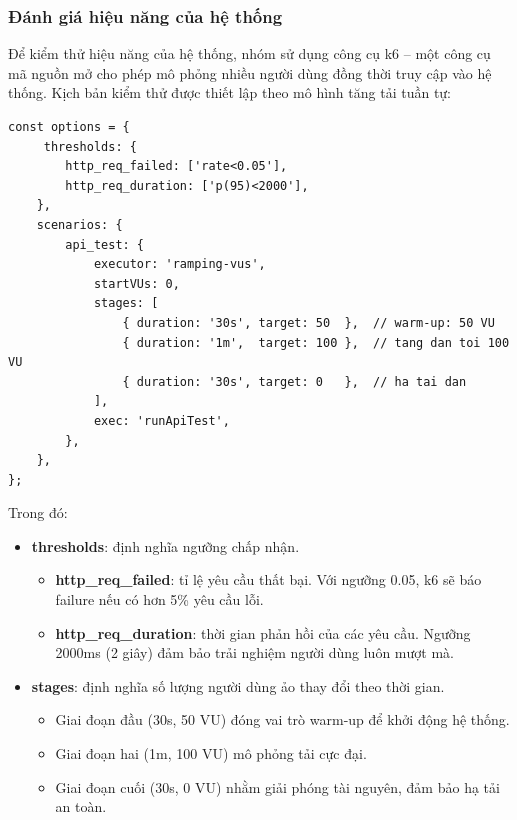 \subsubsection{Đánh giá hiệu năng của hệ thống}
Để kiểm thử hiệu năng của hệ thống, nhóm sử dụng công cụ k6 – một công cụ mã nguồn mở cho phép mô phỏng nhiều người dùng đồng thời truy cập vào hệ thống.
Kịch bản kiểm thử được thiết lập theo mô hình tăng tải tuần tự:

\begin{lstlisting}[frame=single, basicstyle=\small\ttfamily, breaklines=true, commentstyle=\color{gray}\itshape]
const options = {
     thresholds: {
        http_req_failed: ['rate<0.05'],
        http_req_duration: ['p(95)<2000'],  
    },
    scenarios: {
        api_test: {
            executor: 'ramping-vus',
            startVUs: 0,
            stages: [
                { duration: '30s', target: 50  },  // warm-up: 50 VU
                { duration: '1m',  target: 100 },  // tang dan toi 100 VU
                { duration: '30s', target: 0   },  // ha tai dan
            ],
            exec: 'runApiTest',
        },
    },
};
\end{lstlisting}
Trong đó:
\begin{itemize}
    \item \textbf{thresholds}: định nghĩa ngưỡng chấp nhận.
          \begin{itemize}
              \item \textbf{http\_req\_failed}: tỉ lệ yêu cầu thất bại. Với ngưỡng 0.05, k6 sẽ báo failure nếu có hơn 5\% yêu cầu lỗi.
              \item \textbf{http\_req\_duration}: thời gian phản hồi của các yêu cầu. Ngưỡng 2000ms (2 giây) đảm bảo trải nghiệm người dùng luôn mượt mà.
          \end{itemize}
    \item \textbf{stages}: định nghĩa số lượng người dùng ảo thay đổi theo thời gian.
          \begin{itemize}
              \item Giai đoạn đầu (30s, 50 VU) đóng vai trò warm-up để khởi động hệ thống.
              \item Giai đoạn hai (1m, 100 VU) mô phỏng tải cực đại.
              \item Giai đoạn cuối (30s, 0 VU) nhằm giải phóng tài nguyên, đảm bảo hạ tải an toàn.
          \end{itemize}
\end{itemize}

